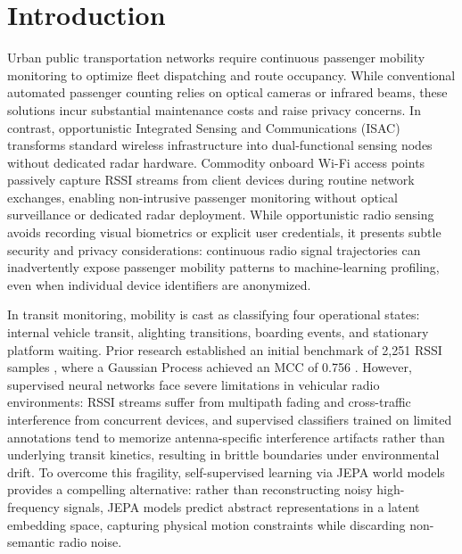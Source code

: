 \section{Introduction}

Urban public transportation networks require continuous passenger mobility monitoring to optimize fleet dispatching and route occupancy. While conventional automated passenger counting relies on optical cameras or infrared beams, these solutions incur substantial maintenance costs and raise privacy concerns. In contrast, opportunistic Integrated Sensing and Communications (ISAC) transforms standard wireless infrastructure into dual-functional sensing nodes without dedicated radar hardware. Commodity onboard Wi-Fi access points passively capture \ac{RSSI} streams from client devices during routine network exchanges, enabling non-intrusive passenger monitoring without optical surveillance or dedicated radar deployment. While opportunistic radio sensing avoids recording visual biometrics or explicit user credentials, it presents subtle security and privacy considerations: continuous radio signal trajectories can inadvertently expose passenger mobility patterns to machine-learning profiling, even when individual device identifiers are anonymized.

In transit monitoring, mobility is cast as classifying four operational states: internal vehicle transit, alighting transitions, boarding events, and stationary platform waiting. Prior research established an initial benchmark of 2,251 \ac{RSSI} samples \cite{matos2026icaisf}, where a Gaussian Process achieved an \ac{MCC} of 0.756 \cite{ribeiro2026eucnc}. However, supervised neural networks face severe limitations in vehicular radio environments: \ac{RSSI} streams suffer from multipath fading and cross-traffic interference from concurrent devices, and supervised classifiers trained on limited annotations tend to memorize antenna-specific interference artifacts rather than underlying transit kinetics, resulting in brittle boundaries under environmental drift. To overcome this fragility, self-supervised learning via \ac{JEPA} world models provides a compelling alternative: rather than reconstructing noisy high-frequency signals, \ac{JEPA} models predict abstract representations in a latent embedding space, capturing physical motion constraints while discarding non-semantic radio noise.


